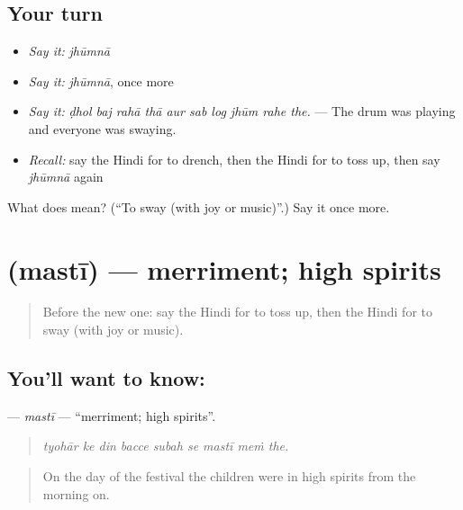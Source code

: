 \subsection*{Your turn}
\begin{itemize}
\raggedright
  \item \emph{Say it:} \emph{jhūmnā}
  \item \emph{Say it:} \emph{jhūmnā}, once more
  \item \emph{Say it:} \emph{ḍhol baj rahā thā aur sab log jhūm rahe the.} — The drum was playing and everyone was swaying.
  \item \emph{Recall:} say the Hindi for to drench, then the Hindi for to toss up, then say \emph{jhūmnā} again
\end{itemize}

\begin{tcolorbox}[breakable,colback=teal!4,colframe=teal!35!black,title={Before you move on}]
What does  mean? (\textquotedblleft{}To sway (with joy or music)\textquotedblright{}.) Say it once more.
\end{tcolorbox}
\section[\texorpdfstring{\hi{मस्ती} (mastī)}{मस्ती (mastī)}]{ (mastī) — merriment; high spirits}

\label{lesson:HI-C329-masti}



\begin{quote}
Before the new one: say the Hindi for to toss up, then the Hindi for to sway (with joy or music).
\end{quote}

\subsection*{You'll want to know: }
\textbf{} — \emph{mastī} — \textquotedblleft{}merriment; high spirits\textquotedblright{}.

\begin{quote}
        
\end{quote}

\begin{quote}
\emph{tyohār ke din bacce subah se mastī meṁ the.}
\end{quote}

\begin{quote}
On the day of the festival the children were in high spirits from the morning on.
\end{quote}

